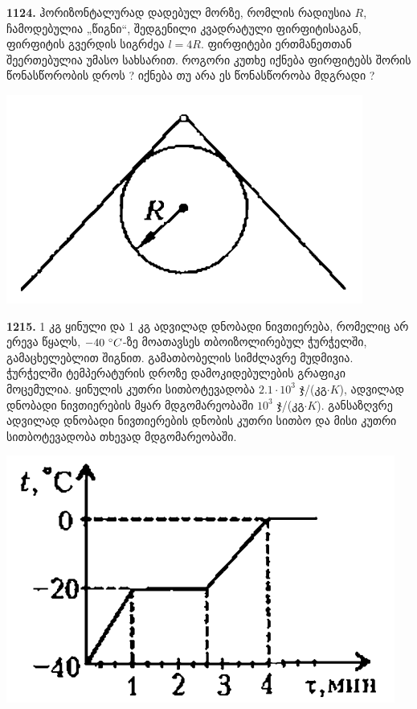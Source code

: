 \documentclass[12pt,a4paper,]{report}
\begin{document}
\textbf{1124.} ჰორიზონტალურად დადებულ მორზე, რომლის რადიუსია $R$, ჩამოდებულია „წიგნი“, შედგენილი კვადრატული ფირფიტისაგან, ფირფიტის გვერდის სიგრძეა $l=4R$. ფირფიტები ერთმანეთთან შეერთებულია უმასო სახსარით. როგორი კუთხე იქნება ფირფიტებს შორის წონასწორობის დროს ? იქნება თუ არა ეს წონასწორობა მდგრადი ?
		\begin{center}
			\includegraphics[scale=0.2]{images/F1124.png}
		\end{center}

\textbf{1215.} 1 კგ ყინული და 1 კგ ადვილად დნობადი ნივთიერება, რომელიც არ ერევა წყალს, $-40\ \degree C$-ზე მოათავსეს თბოიზოლირებულ ჭურჭელში, გამაცხელებლით შიგნით. გამათბობელის სიმძლავრე მუდმივია. ჭურჭელში ტემპერატურის დროზე დამოკიდებულების გრაფიკი მოცემულია. ყინულის კუთრი სითბოტევადობა $2.1\cdot10^3$ ჯ/(კგ$\cdot K$), ადვილად დნობადი ნივთიერების მყარ მდგომარეობაში $10^3$ ჯ/(კგ$\cdot K$). განსაზღვრე ადვილად დნობადი ნივთიერების დნობის კუთრი სითბო და მისი კუთრი სითბოტევადობა თხევად მდგომარეობაში.
		\begin{center}
			\includegraphics[scale=0.5]{images/F1215.png}
		\end{center}
	
\end{document}
